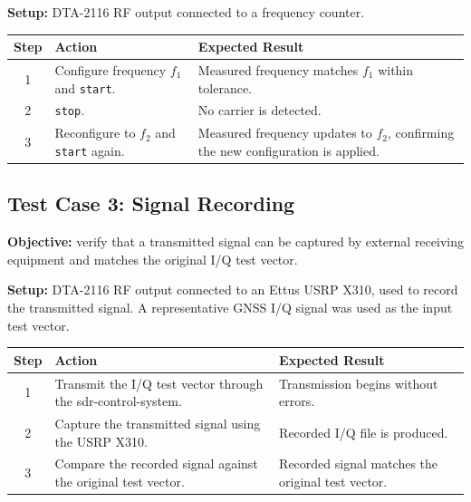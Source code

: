 \textbf{Setup:} DTA-2116 \gls{RF} output connected to a 
frequency counter.

\begin{center}
\small
\begin{tabular}{|c|p{5.5cm}|p{4.0cm}|}
\hline
\textbf{Step} & \textbf{Action} & \textbf{Expected Result} \\
\hline
1 & Configure frequency $f_1$ and \texttt{start}. & Measured
frequency matches $f_1$ within tolerance. \\
\hline
2 & \texttt{stop}. & No carrier is detected. \\
\hline
3 & Reconfigure to $f_2$ and \texttt{start} again. & Measured
frequency updates to $f_2$, confirming the new configuration is
applied. \\
\hline
\end{tabular}
\end{center}


\subsection{Test Case 3: Signal Recording}
\label{sec:tc3-recording}

\textbf{Objective:} verify that a transmitted signal can be captured
by external receiving equipment and matches the original \gls{I/Q}
test vector.

\textbf{Setup:} DTA-2116 \gls{RF} output connected to an Ettus USRP
X310, used to record the transmitted signal.
A representative \gls{GNSS} \gls{I/Q} signal was used as the input test vector.


\begin{center}
\small
\begin{tabular}{|c|p{5.5cm}|p{4.0cm}|}
\hline
\textbf{Step} & \textbf{Action} & \textbf{Expected Result} \\
\hline
1 & Transmit the \gls{I/Q} test vector through the
\gls{sdr-control-system}. & Transmission begins without errors. \\
\hline
2 & Capture the transmitted signal using the USRP X310.
& Recorded \gls{I/Q} file is produced. \\
\hline
3 & Compare the recorded signal against the original test vector.
& Recorded signal matches the original test vector. \\
\hline
\end{tabular}
\end{center}
